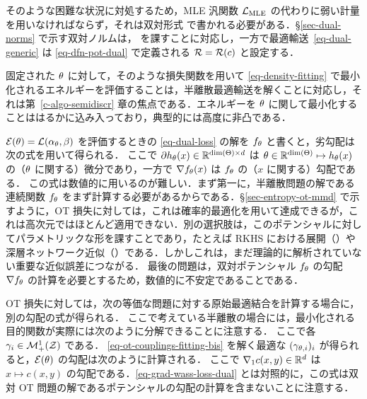 そのような困難な状況に対処するため，MLE 汎関数 $\mathcal{L}_{\text{MLE}}$ の代わりに弱い計量を用いなければならず，それは双対形式
で書かれる必要がある．\S\ref{sec-dual-norms} で示す双対ノルムは，
を課すことに対応し，一方で最適輸送~\eqref{eq-dual-generic} は \eqref{eq-dfn-pot-dual} で定義される $\mathcal{R} = \mathcal{R}(c)$ と設定する．

固定された $\theta$ に対して，そのような損失関数を用いて \eqref{eq-density-fitting} で最小化されるエネルギーを評価することは，半離散最適輸送を解くことに対応し，それは第~\ref{c-algo-semidiscr} 章の焦点である．エネルギーを $\theta$ に関して最小化することははるかに込み入っており，典型的には高度に非凸である．

$\mathcal{E}(\theta) = \mathcal{L}(\alpha_\theta,\beta)$ を評価するときの \eqref{eq-dual-loss} の解を $f_\theta$ と書くと，劣勾配は次の式を用いて得られる．
ここで $\partial h_\theta(x) \in \mathbb{R}^{\text{dim}(\Theta) \times d}$ は $\theta \in \mathbb{R}^{\text{dim}(\Theta)} \mapsto h_\theta(x)$ の（$\theta$ に関する）微分であり，一方で $\nabla f_\theta(x)$ は $f_\theta$ の（$x$ に関する）勾配である．
%
この式は数値的に用いるのが難しい．まず第一に，半離散問題の解である連続関数 $f_\theta$ をまず計算する必要があるからである．\S\ref{sec-entropy-ot-mmd} で示すように，OT 損失に対しては，これは確率的最適化を用いて達成できるが，これは高次元ではほとんど適用できない．別の選択肢は，このポテンシャルに対してパラメトリックな形を課すことであり，たとえば RKHS における展開（\citet{genevay2016stochastic}）や深層ネットワーク近似（\citep{WassersteinGAN}）である．しかしこれは，まだ理論的に解析されていない重要な近似誤差につながる．
%
最後の問題は，双対ポテンシャル $f_\theta$ の勾配 $\nabla f_\theta$ の計算を必要とするため，数値的に不安定であることである．

OT 損失に対しては，次の等価な問題に対する原始最適結合を計算する場合に，別の勾配の式が得られる．
ここで考えている半離散の場合には，最小化される目的関数が実際には次のように分解できることに注意する．
ここで各 $\gamma_i \in \mathcal{M}_+^1(\mathcal{Z})$ である．
%
\eqref{eq-ot-couplings-fitting-bis} を解く最適な $(\gamma_{\theta,i})_i$ が得られると，$\mathcal{E}(\theta)$ の勾配は次のように計算される．
ここで $\nabla_1 c(x,y) \in \mathbb{R}^d$ は $x \mapsto c(x,y)$ の勾配である．\eqref{eq-grad-wass-loss-dual} とは対照的に，この式は双対 OT 問題の解であるポテンシャルの勾配の計算を含まないことに注意する．


